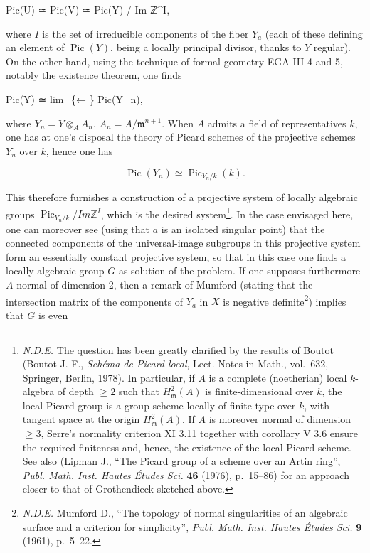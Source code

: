 \documentclass[
]{article}
\newenvironment{Shaded}{}{}
\newcommand{\NormalTok}[1]{#1}
\begin{document}
\begin{Shaded}
\begin{Highlighting}[]
\NormalTok{Pic(U) ≃ Pic(V) ≃ Pic(Y) / Im ℤ\^{}I,}
\end{Highlighting}
\end{Shaded}

where \(I\) is the set of irreducible components of the fiber \(Y_{a}\)
(each of these defining an element of \(\operatorname{Pic}(Y)\), being a
locally principal divisor, thanks to \(Y\) regular). On the other hand,
using the technique of formal geometry EGA III 4 and 5, notably the
existence theorem, one finds

\begin{Shaded}
\begin{Highlighting}[]
\NormalTok{Pic(Y) ≃ lim\_\{← \} Pic(Y\_n),}
\end{Highlighting}
\end{Shaded}

where \(Y_{n} = Y \otimes_{A} A_{n}\), \(A_{n} = A/\mathfrak{m}^{n+1}\).
When \(A\) admits a field of representatives \(k\), one has at one's
disposal the theory of Picard schemes of the projective schemes
\(Y_{n}\) over \(k\), hence one has

\[
\operatorname{Pic}(Y_{n}) \simeq \operatorname{Pic}_{Y_{n}/k}(k).
\]

This therefore furnishes a construction of a projective system of
locally algebraic groups
\(\operatorname{Pic}_{Y_{n}/k} / Im \mathbb{Z}^{I}\), which is the
desired system\footnote{\emph{N.D.E.} The question has been greatly
  clarified by the results of Boutot (Boutot J.-F., \emph{Schéma de
  Picard local}, Lect. Notes in Math., vol.~632, Springer, Berlin,
  1978). In particular, if \(A\) is a complete (noetherian) local
  \(k\)-algebra of depth \(\geqslant 2\) such that
  \(H^{2}_{\mathfrak{m}}(A)\) is finite-dimensional over \(k\), the
  local Picard group is a group scheme locally of finite type over
  \(k\), with tangent space at the origin \(H^{2}_{\mathfrak{m}}(A)\).
  If \(A\) is moreover normal of dimension \(\geqslant 3\), Serre's
  normality criterion XI 3.11 together with corollary V 3.6 ensure the
  required finiteness and, hence, the existence of the local Picard
  scheme. See also (Lipman J., ``The Picard group of a scheme over an
  Artin ring'', \emph{Publ. Math. Inst. Hautes Études Sci.} \textbf{46}
  (1976), p.~15--86) for an approach closer to that of Grothendieck
  sketched above.}. In the case envisaged here, one can moreover see
(using that \(a\) is an isolated singular point) that the connected
components of the universal-image subgroups in this projective system
form an essentially constant projective system, so that in this case one
finds a locally algebraic group \(G\) as solution of the problem. If one
supposes furthermore \(A\) normal of dimension 2, then a remark of
Mumford (stating that the intersection matrix of the components of
\(Y_{a}\) in \(X\) is negative definite\footnote{\emph{N.D.E.} Mumford
  D., ``The topology of normal singularities of an algebraic surface and
  a criterion for simplicity'', \emph{Publ. Math. Inst. Hautes Études
  Sci.} \textbf{9} (1961), p.~5--22.}) implies that \(G\) is even
\end{document}
